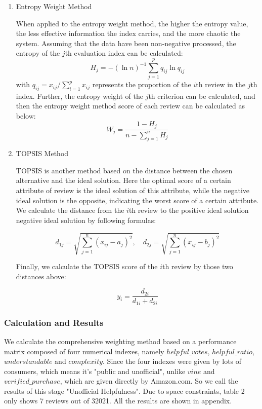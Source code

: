 \documentclass{mcmthesis}
\begin{document}
\begin{enumerate}[leftmargin=*,fullwidth,itemindent=2em,label=(\arabic*)]

\item{Entropy Weight Method}

\quad \quad When applied to the entropy weight method, the higher the entropy value, the less effective information the index carries, and the more chaotic the system.
Assuming that the data have been non-negative processed, the entropy of the $j$th evaluation index can be calculated:
\begin{equation}
    H_j=-{(\ln{n})}^{-1} \sum_{j=1}^p {q_{ij}}{\ln{q_{ij}}}
\end{equation}
\quad \quad with $q_{ij}=x_{ij}/\sum_{i=1}^p {x_{ij}}$ represents the proportion of the $i$th review in the $j$th index. Further, the entropy weight of the $j$th criterion can be calculated, and then the entropy weight method score of each review can be calculated as below:
\begin{equation}
    W_j = \frac{1-H_j}{n-\sum_{j=1}^n {H_j}}
\end{equation}

\item{TOPSIS Method}

\quad \quad TOPSIS is another method based on the distance between the chosen alternative and the ideal solution. Here the optimal score of a certain attribute of review is the ideal solution of this attribute, while the negative ideal solution is the opposite, indicating the worst score of a certain attribute. We calculate the distance from the $i$th review to the positive ideal solution negative ideal solution by following formulas:

\begin{equation}
d_{1j}=\sqrt{\sum_{j=1}^n {(x_{ij}-a_j)}^2},\quad d_{2j}=\sqrt{\sum_{j=1}^n {(x_{ij}-b_j)}^2}
\end{equation}\par

\quad \quad Finally, we calculate the TOPSIS score of the $i$th review by those two distances above:

\begin{equation}
    y_i = \frac{d_{2i}}{d_{1i}+d_{2i}}
\end{equation}

\end{enumerate}

\subsubsection{Calculation and Results}
\quad \quad We calculate the comprehensive weighting method based on a performance matrix composed of four numerical indexes, namely   $helpful\_votes$, $helpful\_ratio$, $understandable$ and $complexity$. Since the four indexes were given by lots of consumers, which means it's "public and unofficial", unlike $vine$ and $verified\_purchase$, which are given directly by Amazon.com. So we call the results of this stage "Unofficial Helpfulness". Due to space constraints, table 2 only shows 7 reviews out of 32021. All the results are shown in appendix. 
\end{document}
